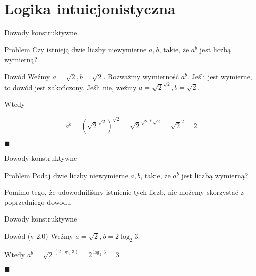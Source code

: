 \documentclass{beamer}
\begin{document}
\section{Logika intuicjonistyczna}
\begin{frame}{Dowody konstruktywne}
  \begin{block}{Problem}
  Czy istnieją dwie liczby niewymierne $a, b$, takie, że $a^b$ jest liczbą wymierną?
  \end{block}
  
  \pause
  
  \begin{block}{Dowód}
  Weźmy $a=\sqrt{2}, b=\sqrt{2}$. Rozważmy wymierność $a^{b}$. Jeśli jest wymierne, to dowód jest zakończony. Jeśli nie, weźmy $a=\sqrt{2}^{\sqrt{2}}, b=\sqrt{2}$.
  
  Wtedy
  
  $$ a^b = {\left( \sqrt{2}^{\sqrt{2}} \right)}^{\sqrt{2}}
  = \sqrt{2}^{\sqrt{2} \ast \sqrt{2}} = \sqrt{2}^2 = 2
  $$
  
  $\blacksquare$
  
  \end{block}
\end{frame}

\begin{frame}{Dowody konstruktywne}
  \begin{block}{Problem}
  Podaj dwie liczby niewymierne $a, b$, takie, że $a^b$ jest liczbą wymierną?
  \end{block}
  
  \pause
  
  \begin{alertblock}{}
  Pomimo tego, że udowodniliśmy istnienie tych liczb, nie możemy skorzystać z poprzedniego dowodu
  \end{alertblock}
\end{frame}

\begin{frame}{Dowody konstruktywne}
  \begin{block}{Dowód (v 2.0)}
  Weźmy $ a=\sqrt{2}, b=2\log_2{3} $.
  
  Wtedy $ a^b = \sqrt{2}^{(2\log_2{3})} = 2^{\log_2{3}} = 3 $
  
  $\blacksquare$
  \end{block}
\end{frame}
\end{document}
